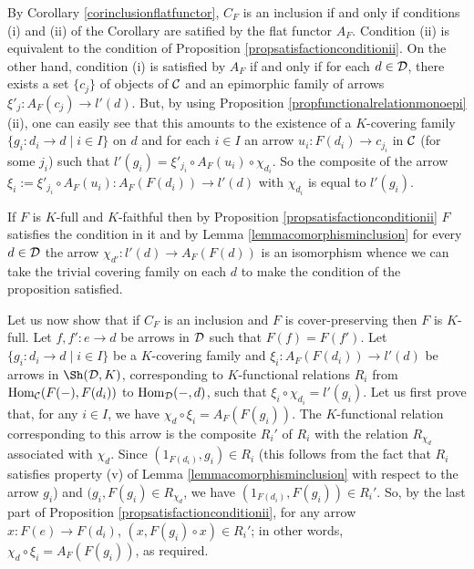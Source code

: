 \documentclass[a4paper,12pt]{article}
\begin{document}
\begin{proofs}
By Corollary \ref{corinclusionflatfunctor}, $C_{F}$ is an inclusion if and only if conditions (i) and (ii) of the Corollary are satified by the flat functor $A_{F}$. Condition (ii) is equivalent to the condition of Proposition \ref{propsatisfactionconditionii}. On the other hand, condition (i) is satisfied by $A_{F}$ if and only if for each $d\in {\cal D}$, there exists a set $\{c_{j}\}$ of objects of $\cal C$ and an epimorphic family of arrows $\xi'_{j}:A_{F}(c_{j})\to l'(d)$. But, by using Proposition \ref{propfunctionalrelationmonoepi}(ii), one can easily see that this amounts to the existence of a $K$-covering family $\{g_{i}:d_{i}\to d \mid i\in I\}$ on $d$ and for each $i\in I$ an arrow $u_{i}:F(d_{i})\to c_{j_{i}}$ in $\cal C$ (for some $j_{i}$) such that $l'(g_{i})=\xi'_{j_{i}}\circ A_{F}(u_{i})\circ \chi_{d_{i}}$. So the composite of the arrow $\xi_{i}:=\xi'_{j_{i}}\circ A_{F}(u_{i}):A_{F}(F(d_{i}))\to l'(d)$ with $\chi_{d_{i}}$ is equal to $l'(g_{i})$.  

If $F$ is $K$-full and $K$-faithful then by Proposition \ref{propsatisfactionconditionii} $F$ satisfies the condition in it and by Lemma \ref{lemmacomorphisminclusion} for every $d\in {\cal D}$ the arrow $\chi_{d'}:l'(d)\to A_{F}(F(d))$ is an isomorphism whence we can take the trivial covering family on each $d$ to make the condition of the proposition satisfied. 

Let us now show that if $C_{F}$ is an inclusion and $F$ is cover-preserving then $F$ is $K$-full.
Let $f, f':e\to d$ be arrows in $\cal D$ such that $F(f)=F(f')$. Let $\{g_{i}:d_{i}\to d \mid i\in I\}$ be a $K$-covering family and $\xi_{i}:A_{F}(F(d_{i}))\to l'(d)$ be arrows in $\Sh({\cal D}, K)$, corresponding to $K$-functional relations $R_{i}$ from $\textup{Hom}_{\cal C}(F(-),F(d_{i}))$ to $\textup{Hom}_{\cal D}(-,d)$, such that $\xi_{i}\circ \chi_{d_{i}}=l'(g_{i})$. Let us first prove that, for any $i\in I$, we have $\chi_{d}\circ \xi_{i}=A_{F}(F(g_{i}))$. The $K$-functional relation corresponding to this arrow is the composite $R_{i}'$ of $R_{i}$ with the relation $R_{\chi_{d}}$ associated with $\chi_{d}$. Since $(1_{F(d_{i})}, g_{i})\in R_{i}$ (this follows from the fact that $R_{i}$ satisfies property (v) of Lemma \ref{lemmacomorphisminclusion} with respect to the arrow $g_{i}$) and $(g_{i}, F(g_{i})\in R_{\chi_{d}}$, we have $(1_{F(d_{i})}, F(g_{i}))\in R_{i}'$. So, by the last part of Proposition \ref{propsatisfactionconditionii}, for any arrow $x:F(e)\to F(d_{i})$, $(x, F(g_{i})\circ x)\in R_{i}'$; in other words, $\chi_{d}\circ \xi_{i}=A_{F}(F(g_{i}))$, as required. 


\end{proofs}
\end{document}
